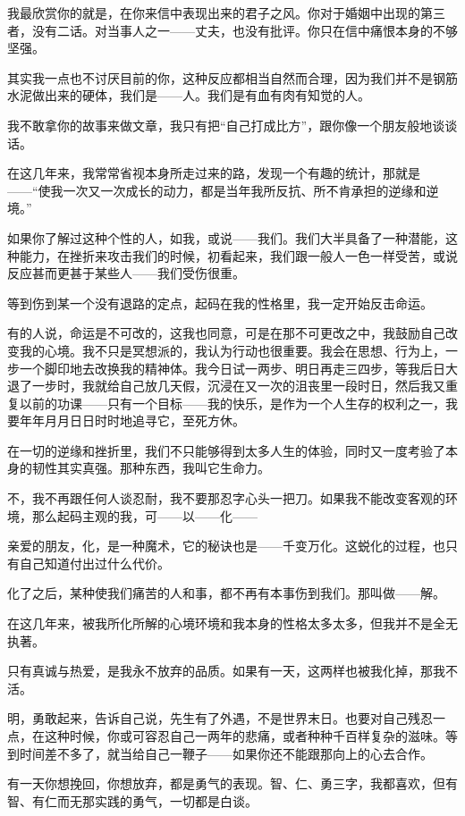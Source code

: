 \par {}
\par 我最欣赏你的就是，在你来信中表现出来的君子之风。你对于婚姻中出现的第三者，没有二话。对当事人之一——丈夫，也没有批评。你只在信中痛恨本身的不够坚强。
\par 其实我一点也不讨厌目前的你，这种反应都相当自然而合理，因为我们并不是钢筋水泥做出来的硬体，我们是——人。我们是有血有肉有知觉的人。
\par 我不敢拿你的故事来做文章，我只有把“自己打成比方”，跟你像一个朋友般地谈谈话。
\par 在这几年来，我常常省视本身所走过来的路，发现一个有趣的统计，那就是——“使我一次又一次成长的动力，都是当年我所反抗、所不肯承担的逆缘和逆境。”
\par 如果你了解过这种个性的人，如我，或说——我们。我们大半具备了一种潜能，这种能力，在挫折来攻击我们的时候，初看起来，我们跟一般人一色一样受苦，或说反应甚而更甚于某些人——我们受伤很重。
\par 等到伤到某一个没有退路的定点，起码在我的性格里，我一定开始反击命运。
\par 有的人说，命运是不可改的，这我也同意，可是在那不可更改之中，我鼓励自己改变我的心境。我不只是冥想派的，我认为行动也很重要。我会在思想、行为上，一步一个脚印地去改换我的精神体。我今日试一两步、明日再走三四步，等我后日大退了一步时，我就给自己放几天假，沉浸在又一次的沮丧里一段时日，然后我又重复以前的功课——只有一个目标——我的快乐，是作为一个人生存的权利之一，我要年年月月日日时时地追寻它，至死方休。
\par 在一切的逆缘和挫折里，我们不只能够得到太多人生的体验，同时又一度考验了本身的韧性其实真强。那种东西，我叫它生命力。
\par 不，我不再跟任何人谈忍耐，我不要那忍字心头一把刀。如果我不能改变客观的环境，那么起码主观的我，可——以——化——
\par 亲爱的朋友，化，是一种魔术，它的秘诀也是——千变万化。这蜕化的过程，也只有自己知道付出过什么代价。
\par 化了之后，某种使我们痛苦的人和事，都不再有本事伤到我们。那叫做——解。
\par 在这几年来，被我所化所解的心境环境和我本身的性格太多太多，但我并不是全无执著。
\par 只有真诚与热爱，是我永不放弃的品质。如果有一天，这两样也被我化掉，那我不活。
\par 明，勇敢起来，告诉自己说，先生有了外遇，不是世界末日。也要对自己残忍一点，在这种时候，你或可容忍自己一两年的悲痛，或者种种千百样复杂的滋味。等到时间差不多了，就当给自己一鞭子——如果你还不能跟那向上的心去合作。
\par 有一天你想挽回，你想放弃，都是勇气的表现。智、仁、勇三字，我都喜欢，但有智、有仁而无那实践的勇气，一切都是白谈。

